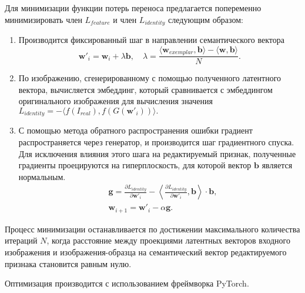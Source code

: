 Для минимизации функции потерь переноса предлагается попеременно минимизировать член $L_{feature}$ и член $L_{identity}$ следующим образом:
\begin{enumerate}
    \item Производится фиксированный шаг в направлении семантического вектора
    $$\mathbf w'_i = \mathbf w_i + \lambda \mathbf b, \quad \lambda = \frac{\langle \mathbf w_{exemplar}, \mathbf b \rangle - \langle \mathbf w, \mathbf b \rangle}{N}.$$
    \item По изображению, сгенерированному с помощью полученного латентного вектора, вычисляется эмбеддинг, который сравнивается с эмбеддингом оригинального изображения для вычисления значения
    $L_{identity} = - \langle f(I_{real}), f(G(\mathbf w'_i)) \rangle.$
    \item С помощью метода обратного распространения ошибки градиент распространяется через генератор, и производится шаг градиентного спуска.
    Для исключения влияния этого шага на редактируемый признак, полученные градиенты проецируются на гиперплоскость, для которой вектор $\mathbf b$ является нормальным.
    \begin{align*}
    &\mathbf g = \frac{\partial L_{identity}}{\partial \mathbf w'_i} - \left\langle {\frac{\partial L_{identity}}{\partial \mathbf w'_i} , \mathbf b} \right\rangle \cdot \mathbf b,\\
    &\mathbf w_{i+1} = \mathbf w'_i - \alpha \mathbf g.
    \end{align*}
\end{enumerate}

Процесс минимизации останавливается по достижении максимального количества итераций $N$, когда расстояние между проекциями латентных векторов входного изображения и изображения-образца на семантический вектор редактируемого признака становится равным нулю.

Оптимизация производится с использованием фреймворка PyTorch.
